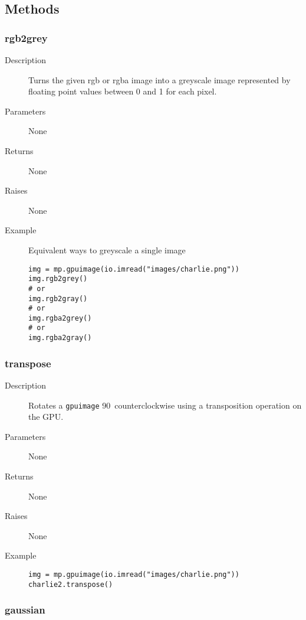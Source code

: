 \subsection{Methods}

\subsubsection{rgb2grey}

\begin{description}
   \item[Description] Turns the given rgb or rgba image into a greyscale image represented by floating point values between 0 and 1 for each pixel.
   \item[Parameters] None
   \item[Returns] None
   \item[Raises] None
   \item[Example] Equivalent ways to greyscale a single image
   \begin{lstlisting}
img = mp.gpuimage(io.imread("images/charlie.png"))
img.rgb2grey()
# or
img.rgb2gray()
# or
img.rgba2grey()
# or
img.rgba2gray()
\end{lstlisting}
\end{description}

\subsubsection{transpose}

\begin{description}
   \item[Description] Rotates a \verb|gpuimage| 90\textdegree \ counterclockwise using a transposition operation on the GPU.
   \item[Parameters] None
   \item[Returns] None
   \item[Raises] None
   \item[Example] \phantom{}
   \begin{lstlisting}
img = mp.gpuimage(io.imread("images/charlie.png"))
charlie2.transpose()
\end{lstlisting}
\end{description}

\subsubsection{gaussian}

